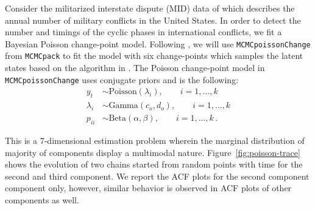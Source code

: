 \documentclass[11pt]{article}
\theoremstyle{remark}
\begin{document}
Consider the militarized interstate dispute (MID) data of \cite{martin2011mcmcpack} which describes the annual number of military conflicts in the United States. In order to detect the number and timings of the cyclic phases in international conflicts, we fit a Bayesian Poisson change-point model. Following \cite{martin2011mcmcpack}, we will use \texttt{MCMCpoissonChange} from \texttt{MCMCpack} to fit the model with six change-points which samples the latent states based on the algorithm in \cite{chib1998estimation}. The Poisson change-point model in \texttt{MCMCpoissonChange} uses conjugate priors and is the following:
%
\begin{align*}
    y_t &\sim \text{Poisson}(\lambda_i), \qquad i = 1, ..., k\\
    \lambda_i &\sim \text{Gamma}(c_o, d_o), \qquad i = 1,..., k\\
    p_{ii} &\sim \text{Beta}(\alpha, \beta), \qquad i = 1,..., k\,.
\end{align*}

This is a 7-dimensional estimation problem wherein the marginal distribution of majority of components display a multimodal nature. Figure~\ref{fig:poisson-trace} shows the evolution of two chains started from random points with time for the second and third component. We report the ACF plots for the second component component only, however, similar behavior is observed in ACF plots of other components as well.
\end{document}
